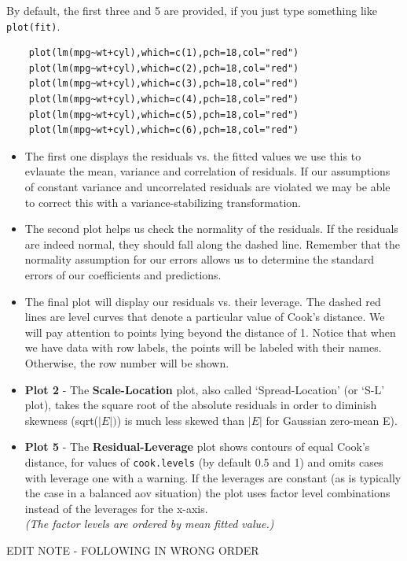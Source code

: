 \documentclass[residuals.tex]{subfiles}
\begin{document}
\noindent By default, the first three and 5 are provided, if you just type something like \texttt{plot(fit)}.
\begin{framed}
	\begin{verbatim}
	plot(lm(mpg~wt+cyl),which=c(1),pch=18,col="red")
	plot(lm(mpg~wt+cyl),which=c(2),pch=18,col="red")
	plot(lm(mpg~wt+cyl),which=c(3),pch=18,col="red")
	plot(lm(mpg~wt+cyl),which=c(4),pch=18,col="red")
	plot(lm(mpg~wt+cyl),which=c(5),pch=18,col="red")
	plot(lm(mpg~wt+cyl),which=c(6),pch=18,col="red")
	\end{verbatim}
\end{framed}
\begin{itemize}
\item The first one displays the residuals vs. the fitted values
 we use this to evlauate the mean, variance and correlation of residuals.
 If our assumptions of constant variance and uncorrelated residuals are
 violated we may be able to correct this with a variance-stabilizing
 transformation.
 
\item The second plot helps us check the normality of the residuals. If the
 residuals are indeed normal, they should fall along the dashed line.
 Remember that the normality assumption for our errors allows us to determine
 the standard errors of our coefficients and predictions.
 
\item The final plot will display our residuals vs. their leverage. The dashed red
 lines are level curves that denote a particular value of Cook's distance.
 We will pay attention to points lying beyond the distance of 1. Notice that
 when we have data with row labels, the points will be labeled with their
 names. Otherwise, the row number will be shown.
\end{itemize}
\newpage
\begin{itemize}
	\item \textbf{Plot 2} -
	The \textbf{Scale-Location} plot, also called ‘Spread-Location’ (or ‘S-L’ plot), takes the square root of the absolute residuals in order to diminish skewness (sqrt($|E|)$) is much less skewed than $| E |$ for Gaussian zero-mean E).
	
	\item \textbf{Plot 5} - 
	The \textbf{Residual-Leverage} plot shows contours of equal Cook's distance, for values of \texttt{cook.levels} (by default 0.5 and 1) and omits cases with leverage one with a warning. If the leverages are constant (as is typically the case in a balanced aov situation) the plot uses factor level combinations instead of the leverages for the x-axis. \\
	\textit{(The factor levels are ordered by mean fitted value.)}
\end{itemize}
\newpage
EDIT NOTE - FOLLOWING IN WRONG ORDER
\end{document}
